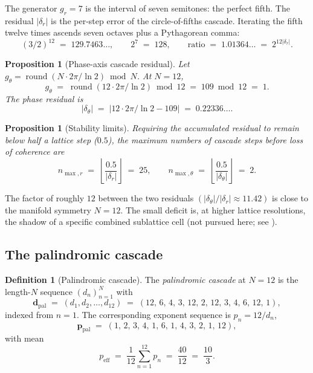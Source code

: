 \documentclass[11pt,a4paper]{article}
\newtheorem{proposition}[theorem]{Proposition}
\theoremstyle{definition}
\newtheorem{definition}[theorem]{Definition}
\theoremstyle{remark}
\DeclareMathOperator{\round}{round}
\begin{document}
The generator $g_{r}=7$ is the interval of seven semitones: the perfect fifth. The residual $|\delta_{r}|$ is the per-step error of the circle-of-fifths cascade. Iterating the fifth twelve times ascends seven octaves plus a Pythagorean comma:
\[
(3/2)^{12} \;=\; 129.7463\ldots, \qquad 2^{7} \;=\; 128, \qquad \text{ratio} \;=\; 1.01364\ldots \;=\; 2^{12|\delta_{r}|}.
\]

\begin{proposition}[Phase-axis cascade residual]\label{prop:cascadetheta}
Let $g_{\theta} = \round(N\cdot 2\pi/\ln 2)\bmod N$. At $N=12$,
\[
g_{\theta} \;=\; \round(12\cdot 2\pi/\ln 2)\bmod 12 \;=\; 109\bmod 12 \;=\; 1.
\]
The phase residual is
\[
|\delta_{\theta}| \;=\; \bigl|12\cdot 2\pi/\ln 2 - 109\bigr| \;=\; 0.22336\ldots.
\]
\end{proposition}

\begin{proposition}[Stability limits]\label{prop:stability}
Requiring the accumulated residual to remain below half a lattice step ($0.5$), the maximum numbers of cascade steps before loss of coherence are
\[
n_{\max,r} \;=\; \left\lfloor\frac{0.5}{|\delta_{r}|}\right\rfloor \;=\; 25, \qquad
n_{\max,\theta} \;=\; \left\lfloor\frac{0.5}{|\delta_{\theta}|}\right\rfloor \;=\; 2.
\]
\end{proposition}

The factor of roughly $12$ between the two residuals $(|\delta_{\theta}|/|\delta_{r}| \approx 11.42)$ is close to the manifold symmetry $N=12$. The small deficit is, at higher lattice resolutions, the shadow of a specific combined sublattice cell (not pursued here; see \cite{Guide}).

\subsection{The palindromic cascade}

\begin{definition}[Palindromic cascade]\label{def:palindrome}
The \emph{palindromic cascade} at $N=12$ is the length-$N$ sequence $(d_{n})_{n=1}^{N}$ with
\[
\mathbf{d}_{\mathrm{pal}} \;=\; (d_{1},d_{2},\ldots,d_{12}) \;=\; (12,\,6,\,4,\,3,\,12,\,2,\,12,\,3,\,4,\,6,\,12,\,1),
\]
indexed from $n=1$. The corresponding exponent sequence is $p_{n}=12/d_{n}$,
\[
\mathbf{p}_{\mathrm{pal}} \;=\; (1,\,2,\,3,\,4,\,1,\,6,\,1,\,4,\,3,\,2,\,1,\,12),
\]
with mean
\[
p_{\mathrm{eff}} \;=\; \frac{1}{12}\sum_{n=1}^{12}p_{n} \;=\; \frac{40}{12} \;=\; \frac{10}{3}.
\]
\end{definition}
\end{document}
